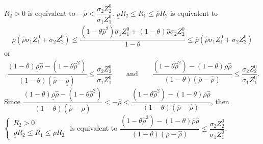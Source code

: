 \documentclass[10pt]{article}
\begin{document}
$ R_2 > 0 $ is equivalent to $ - {\hat \rho} < \dfrac{\sigma_2 Z_2^0}{\sigma_1 Z_1^0} $.
$ \underline{\rho} R_2 \leqslant R_1 \leqslant \overline{\rho} R_2 $ is equivalent to 
\begin{eqnarray*}
\underline{\rho} ({\hat \rho} \sigma_1 Z_1^0 + \sigma_2 Z_2^0) \leqslant \dfrac{(1 - \theta {\hat \rho}^2) \sigma_1 Z_1^0 + (1 - \theta) {\hat \rho} \sigma_2 Z_2^0}{1 - \theta} \leqslant \overline{\rho} ({\hat \rho} \sigma_1 Z_1^0 + \sigma_2 Z_2^0)
\end{eqnarray*}
or
\begin{eqnarray*}
\dfrac{(1 - \theta) \underline{\rho} {\hat \rho} - (1 - \theta {\hat \rho}^2)}{(1 - \theta) ({\hat \rho} - \underline{\rho})} \leqslant \dfrac{\sigma_2 Z_2^0}{\sigma_1 Z_1^0} \qquad \text{and} \qquad \dfrac{(1 - \theta {\hat \rho}^2) - (1 - \theta) \overline{\rho} {\hat \rho}}{(1 - \theta) (\overline{\rho} - {\hat \rho})} \leqslant \dfrac{\sigma_2 Z_2^0}{\sigma_1 Z_1^0}.
\end{eqnarray*}
Since $ \dfrac{(1 - \theta) \underline{\rho} {\hat \rho} - (1 - \theta {\hat \rho}^2)}{(1 - \theta) ({\hat \rho} - \underline{\rho})} < - {\hat \rho} < \dfrac{(1 - \theta {\hat \rho}^2) - (1 - \theta) \overline{\rho} {\hat \rho}}{(1 - \theta) (\overline{\rho} - {\hat \rho})} $, then $ \left\{ \begin{matrix} R_2 > 0 \\ \underline{\rho} R_2 \leqslant R_1 \leqslant \overline{\rho} R_2 \end{matrix} \right. $ is equivalent to $ \dfrac{(1 - \theta {\hat \rho}^2) - (1 - \theta) \overline{\rho} {\hat \rho}}{(1 - \theta) (\overline{\rho} - {\hat \rho})} \leqslant \dfrac{\sigma_2 Z_2^0}{\sigma_1 Z_1^0} $.
\end{document}

